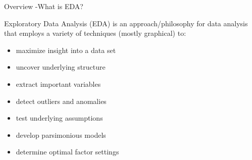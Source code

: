 \documentclass[11pt]{beamer}
\begin{document}
\begin{frame}{
	\begin{minipage}[t]{0.55\textwidth}
		Overview -What is EDA?
	\end{minipage}
	\hfill
	\begin{minipage}[t]{0.35\textwidth}
		\flushright
	\end{minipage}
}{}

	Exploratory Data Analysis (EDA) is an approach/philosophy for data analysis that employs a variety of techniques (mostly graphical) to:
	
	\begin{itemize}
		\item maximize insight into a data set
		\item uncover underlying structure
		\item extract important variables
		\item detect outliers and anomalies
		\item test underlying assumptions
		\item develop parsimonious models
		\item determine optimal factor settings
	\end{itemize}
\colorbox{yellow}{\parencite{whatiseda}}
\end{frame}
\end{document}
